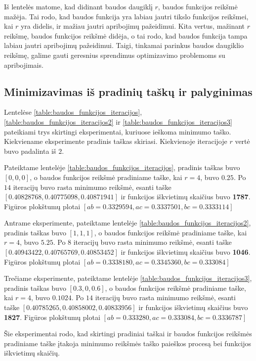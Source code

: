 \documentclass[a4paper,12pt,fleqn]{article}
\begin{document}
Iš lentelės matome, kad didinant baudos daugiklį $r$, baudos funkcijos reikšmė mažėja. 
Tai rodo, kad baudos funkcija yra labiau jautri tikslo funkcijos reikšmei, kai $r$ yra didelis, ir mažiau jautri apribojimų pažeidimui. 
Kita vertus, mažinant $r$ reikšmę, baudos funkcijos reikšmė didėja, o tai rodo, kad baudos funkcija tampa labiau jautri apribojimų pažeidimui.
Taigi, tinkamai parinkus baudos daugiklio reikšmę, galime gauti geresnius sprendimus optimizavimo problemoms su apribojimais.

\pagebreak
\subsection{Minimizavimas iš pradinių taškų ir palyginimas}

Lentelėse \ref{table:baudos_funkcijos_iteracijos}, \ref{table:baudos_funkcijos_iteracijos2} ir \ref{table:baudos_funkcijos_iteracijos3} pateikiami trys skirtingi eksperimentai, kuriuose ieškoma minimumo taško. Kiekviename eksperimente pradinis taškas skiriasi. Kiekvienoje iteracijoje $r$ vertė buvo padalinta iš $2$.

Pateiktame lentelėje \ref{table:baudos_funkcijos_iteracijos}, pradinis taškas buvo $[0, 0, 0]$, o baudos funkcijos reikšmė pradiniame taške, kai $r = 4$, buvo $0.25$. Po $14$ iteracijų buvo rasta minimumo reikšmė, esanti taške $[0.40828768, 0.40775098, 0.40871941]$ ir funkcijos iškvietimų skaičius buvo \textbf{1787}. Figūros plokštumų plotai $[ab = 0.3329594, ac = 0.3337501, bc = 0.3333114]$

Antrame eksperimente, pateiktame lentelėje \ref{table:baudos_funkcijos_iteracijos2}, pradinis taškas buvo $[1, 1, 1]$, o baudos funkcijos reikšmė pradiniame taške, kai $r = 4$, buvo $5.25$. Po $8$ iteracijų buvo rasta minimumo reikšmė, esanti taške $[0.40943422, 0.40765769, 0.40853452]$ ir funkcijos iškvietimų skaičius buvo \textbf{1046}. Figūros plokštumų plotai $[ab = 0.3338180, ac = 0.3345360, bc = 0.333084]$

Trečiame eksperimente, pateiktame lentelėje \ref{table:baudos_funkcijos_iteracijos3}, pradinis taškas buvo $[0.3, 0, 0.6]$, o baudos funkcijos reikšmė pradiniame taške, kai $r = 4$, buvo $0.1024$. Po $14$ iteracijų buvo rasta minimumo reikšmė, esanti taške $[0.40785265, 0.40858002, 0.40833956]$ ir funkcijos iškvietimų skaičius buvo \textbf{1827}. Figūros plokštumų plotai $[ab = 0.333280, ac = 0.333084, bc = 0.3336787]$

Šie eksperimentai rodo, kad skirtingi pradiniai taškai ir baudos funkcijos reikšmės pradiniame taške įtakoja minimumo reikšmės taško paieškos procesą bei funkcijos iškvietimų skaičių.
\end{document}
